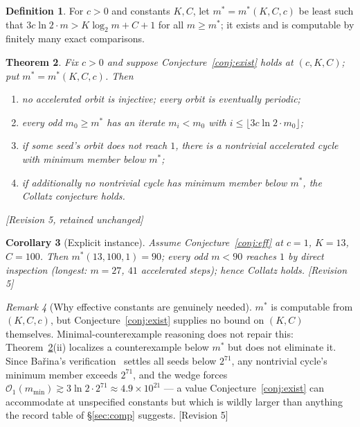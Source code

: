 \documentclass[11pt]{article}
\theoremstyle{plain}
\newtheorem{theorem}{Theorem}[section]
\newtheorem{corollary}[theorem]{Corollary}
\theoremstyle{definition}
\newtheorem{definition}[theorem]{Definition}
\theoremstyle{remark}
\newtheorem{remark}[theorem]{Remark}
\newcommand{\Occ}{\mathcal{O}}
\newcommand{\status}[1]{\textsf{\footnotesize[#1]}}
\begin{document}
\begin{definition}\label{def:mstar}
For $c>0$ and constants $K,C$, let $m^*=m^*(K,C,c)$ be least such that
$3c\ln2\cdot m>K\log_2 m+C+1$ for all $m\ge m^*$; it exists and is computable by finitely many
exact comparisons.
\end{definition}

\begin{theorem}\label{thm:reduction}
Fix $c>0$ and suppose Conjecture~\ref{conj:exist} holds at $(c,K,C)$; put $m^*=m^*(K,C,c)$. Then
\begin{enumerate}[label=(\roman*),leftmargin=2em]
\item no accelerated orbit is injective; every orbit is eventually periodic;
\item every odd $m_0\ge m^*$ has an iterate $m_i<m_0$ with $i\le\lfloor 3c\ln2\cdot m_0\rfloor$;
\item if some seed's orbit does not reach $1$, there is a nontrivial accelerated cycle with minimum
  member below $m^*$;
\item if additionally no nontrivial cycle has minimum member below $m^*$, the Collatz conjecture
  holds.
\end{enumerate}
\status{Revision 5, retained unchanged}
\end{theorem}

\begin{corollary}[Explicit instance]\label{cor:explicit}
Assume Conjecture~\ref{conj:eff} at $c=1$, $K=13$, $C=100$. Then $m^*(13,100,1)=90$; every odd
$m<90$ reaches $1$ by direct inspection (longest: $m=27$, $41$ accelerated steps); hence Collatz
holds. \status{Revision 5}
\end{corollary}

\begin{remark}[Why effective constants are genuinely needed]
$m^*$ is computable from $(K,C,c)$, but Conjecture~\ref{conj:exist} supplies no bound on $(K,C)$
themselves. Minimal-counterexample reasoning does not repair this: Theorem~\ref{thm:reduction}(ii)
localizes a counterexample below $m^*$ but does not eliminate it. Since Ba\v{r}ina's
verification~\cite{Barina} settles all seeds below $2^{71}$, any nontrivial cycle's minimum member
exceeds $2^{71}$, and the wedge forces $\Occ_1(m_{\min})\gtrsim 3\ln2\cdot2^{71}\approx4.9\times10^{21}$
--- a value Conjecture~\ref{conj:exist} can accommodate at unspecified constants but which is
wildly larger than anything the record table of \S\ref{sec:comp} suggests. \status{Revision 5}
\end{remark}
\end{document}

